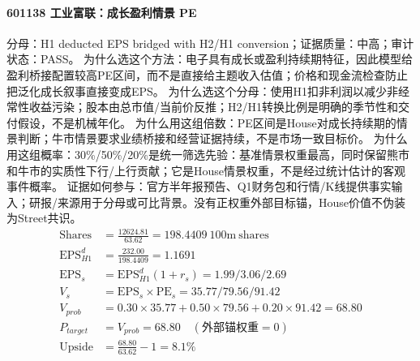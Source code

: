 \paragraph{601138 工业富联：成长盈利情景 PE}
分母：H1 deducted EPS bridged with H2/H1 conversion；证据质量：中高；审计状态：PASS。
为什么选这个方法：电子具有成长或盈利持续期特征，因此模型给盈利桥接配置较高PE区间，而不是直接给主题收入估值；价格和现金流检查防止把泛化成长叙事直接变成EPS。
为什么选这个分母：使用H1扣非利润以减少非经常性收益污染；股本由总市值/当前价反推；H2/H1转换比例是明确的季节性和交付假设，不是机械年化。
为什么用这组倍数：PE区间是House对成长持续期的情景判断；牛市情景要求业绩桥接和经营证据持续，不是市场一致目标价。
为什么用这组概率：30\%/50\%/20\%是统一筛选先验：基准情景权重最高，同时保留熊市和牛市的实质性下行/上行贡献；它是House情景权重，不是经过统计估计的客观事件概率。
证据如何参与：官方半年报预告、Q1财务包和行情/K线提供事实输入；研报/来源用于分母或可比背景。没有正权重外部目标锚，House价值不伪装为Street共识。
\begin{align*}
\mathrm{Shares} &= \frac{12624.81}{63.62}=198.4409\ \mathrm{100m\ shares}\\
\mathrm{EPS}_{H1}^d &= \frac{232.00}{198.4409}=1.1691\\
\mathrm{EPS}_s &= \mathrm{EPS}_{H1}^d(1+r_s)=1.99/3.06/2.69\\
V_s &= \mathrm{EPS}_s\times \mathrm{PE}_s=35.77/79.56/91.42\\
V_{prob} &= 0.30\times 35.77+0.50\times 79.56+0.20\times 91.42=68.80\\
P_{target} &= V_{prob}=68.80\quad(\text{外部锚权重}=0)\\
\mathrm{Upside} &= \frac{68.80}{63.62}-1=8.1\%\\
\end{align*}

